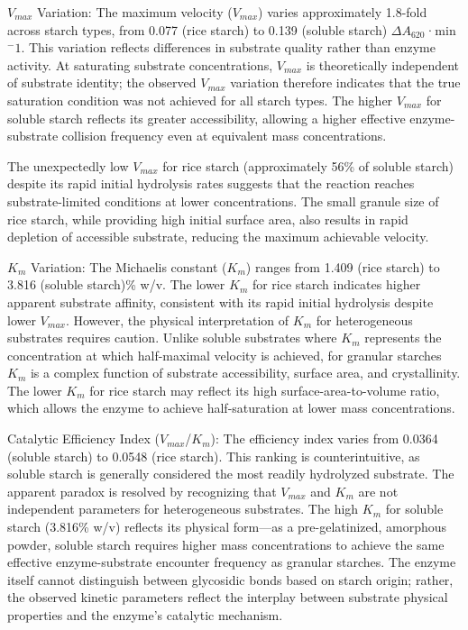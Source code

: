 \documentclass[
  12pt,
]{article}
\begin{document}
\(V_{max}\) Variation: The maximum velocity (\(V_{max}\)) varies
approximately 1.8-fold across starch types, from 0.077 (rice starch) to
0.139 (soluble starch) \(\Delta A_{620}\)·min\(^-1\). This variation
reflects differences in substrate quality rather than enzyme activity.
At saturating substrate concentrations, \(V_{max}\) is theoretically
independent of substrate identity; the observed \(V_{max}\) variation
therefore indicates that the true saturation condition was not achieved
for all starch types. The higher \(V_{max}\) for soluble starch reflects
its greater accessibility, allowing a higher effective enzyme-substrate
collision frequency even at equivalent mass concentrations.

The unexpectedly low \(V_{max}\) for rice starch (approximately 56\% of
soluble starch) despite its rapid initial hydrolysis rates suggests that
the reaction reaches substrate-limited conditions at lower
concentrations. The small granule size of rice starch, while providing
high initial surface area, also results in rapid depletion of accessible
substrate, reducing the maximum achievable velocity.

\(K_{m}\) Variation: The Michaelis constant (\(K_{m}\)) ranges from
1.409 (rice starch) to 3.816 (soluble starch)\% w/v. The lower \(K_{m}\)
for rice starch indicates higher apparent substrate affinity, consistent
with its rapid initial hydrolysis despite lower \(V_{max}\). However,
the physical interpretation of \(K_{m}\) for heterogeneous substrates
requires caution. Unlike soluble substrates where \(K_{m}\) represents
the concentration at which half-maximal velocity is achieved, for
granular starches \(K_{m}\) is a complex function of substrate
accessibility, surface area, and crystallinity. The lower \(K_{m}\) for
rice starch may reflect its high surface-area-to-volume ratio, which
allows the enzyme to achieve half-saturation at lower mass
concentrations.

Catalytic Efficiency Index (\(V_{max}\)/\(K_{m}\)): The efficiency index
varies from 0.0364 (soluble starch) to 0.0548 (rice starch). This
ranking is counterintuitive, as soluble starch is generally considered
the most readily hydrolyzed substrate. The apparent paradox is resolved
by recognizing that \(V_{max}\) and \(K_{m}\) are not independent
parameters for heterogeneous substrates. The high \(K_{m}\) for soluble
starch (3.816\% w/v) reflects its physical form---as a pre-gelatinized,
amorphous powder, soluble starch requires higher mass concentrations to
achieve the same effective enzyme-substrate encounter frequency as
granular starches. The enzyme itself cannot distinguish between
glycosidic bonds based on starch origin; rather, the observed kinetic
parameters reflect the interplay between substrate physical properties
and the enzyme's catalytic mechanism.
\end{document}
